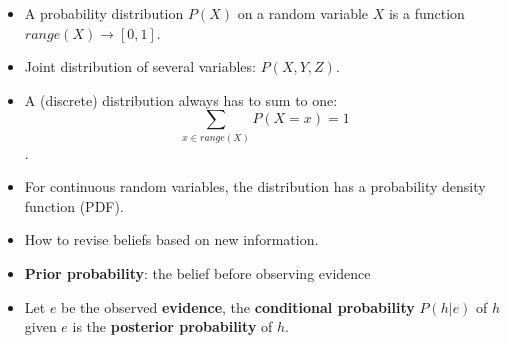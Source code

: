 \documentclass[12pt]{beamer} %
\begin{document}

\begin{slide}
\begin{itemize}
\item A probability distribution $P(X)$ on a random variable $X$ is a
function $range(X) \rightarrow [0,1]$.%
\item Joint distribution of several variables: $P(X,Y,Z)$.
\item A (discrete) distribution always has to sum to one:
\[\sum_{x \in range(X)} P(X=x) = 1\].
\item For continuous random variables, the distribution has a probability density function (PDF).
\end{itemize}
\end{slide}

\begin{slide}
\begin{itemize}
\item How to revise beliefs based on new information.
\item \textbf{Prior probability}: the belief before observing evidence
\item Let $e$ be the observed \textbf{evidence},
the \textbf{conditional probability} $P(h|e)$ of $h$ given
$e$ is the \textbf{posterior probability} of $h$.
\end{itemize}
\end{slide}
\end{document}
